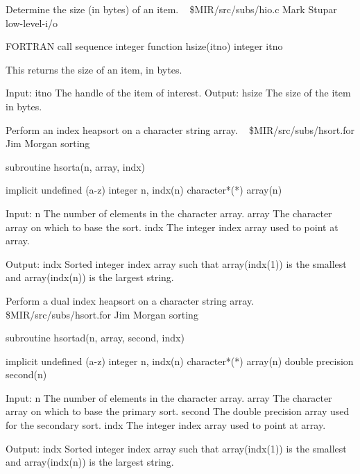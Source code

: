 %
\noindent Determine the size (in bytes) of an item.
\newline \ 
\newline {} \$MIR/src/subs/hio.c
\newline {} Mark Stupar
\newline {} low-level-i/o
\par{\tenpoint
{\eightpoint\begintt
FORTRAN call sequence
        integer function hsize(itno)
        integer itno

  This returns the size of an item, in bytes.

  Input:
    itno        The handle of the item of interest.
  Output:
    hsize       The size of the item in bytes.                          
\endtt}
\par}
%
\noindent Perform an index heapsort on a character string array.
\newline \ 
\newline \abox{File:} \$MIR/src/subs/hsort.for
\newline {} Jim Morgan
\newline \abox{Keywords:} sorting
\par{\tenpoint
{\eightpoint\begintt
      subroutine hsorta(n, array, indx)

      implicit undefined (a-z)
      integer n, indx(n)
      character*(*) array(n)

     Input:
       n        The number of elements in the character array.
       array    The character array on which to base the sort.
       indx     The integer index array used to point at array.

     Output:
       indx     Sorted integer index array such that array(indx(1)) is
                the smallest and array(indx(n)) is the largest string.
\endtt}
\par}
%
\noindent Perform a dual index heapsort on a character string array.
\newline \ 
\newline {} \$MIR/src/subs/hsort.for
\newline \abox{Responsible:} Jim Morgan
\newline {} sorting
\par{\tenpoint
{\eightpoint\begintt
      subroutine hsortad(n, array, second, indx)

      implicit undefined (a-z)
      integer n, indx(n)
      character*(*) array(n)
      double precision second(n)

     Input:
       n        The number of elements in the character array.
       array    The character array on which to base the primary sort.
       second   The double precision array used for the secondary sort.
       indx     The integer index array used to point at array.

     Output:
       indx     Sorted integer index array such that array(indx(1)) is
                the smallest and array(indx(n)) is the largest string.
\endtt}
\par}
